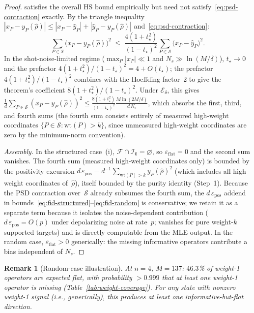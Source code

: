 \documentclass[twocolumn,prx,aps,superscriptaddress,longbibliography,floatfix]{revtex4-2}
\newtheorem*{remark}{Remark}
\begin{document}
\begin{proof}
satisfies the overall HS bound empirically but need
not satisfy~\eqref{eq:psd-contraction} exactly.
By the triangle inequality
$|x_P - y_P(\hat\rho)| \le |x_P - \hat{y}_P|
+ |\hat{y}_P - y_P(\hat\rho)|$
and~\eqref{eq:psd-contraction}:
\begin{equation}\label{eq:mle-variance-bound}
  \sum_{P \in \mathcal{S}}
  \bigl(x_P - y_P(\hat\rho)\bigr)^2
  \;\le\;
  \frac{4(1{+}t_\star^2)}{(1{-}t_\star)^2}
  \sum_{P \in \mathcal{S}}
  \bigl(x_P - \hat{y}_P\bigr)^2.
\end{equation}
In the shot-noise-limited regime ($\max_P |x_P| \ll 1$ and $N_s \gg \ln(M/\delta)$),
$t_\star \to 0$ and the prefactor
$4(1{+}t_\star^2)/(1{-}t_\star)^2 = 4 + O(t_\star)$;
the prefactor $4(1{+}t_\star^2)/(1{-}t_\star)^2$
combines with the Hoeffding factor~$2$
to give the theorem's coefficient
$8(1{+}t_\star^2)/(1{-}t_\star)^2$.
Under $\mathcal{E}_\delta$, this gives
$\frac{1}{d}\sum_{P \in \mathcal{S}}(x_P - y_P(\hat\rho))^2
\le \frac{8(1{+}t_\star^2)}{(1{-}t_\star)^2}
\frac{M\ln(2M/\delta)}{d\,N_s}$,
which absorbs the first, third, and fourth sums
(the fourth sum consists entirely of measured high-weight
coordinates $\{P \in \mathcal{S} : \mathrm{wt}(P) > k\}$,
since unmeasured high-weight coordinates are zero by
the minimum-norm convention).

\emph{Assembly.}
In the structured case~(i), $\mathcal{F} \cap \mathcal{I}_0 =
\varnothing$, so $\varepsilon_{\mathrm{flat}} = 0$ and the second
sum vanishes.
The fourth sum (measured high-weight coordinates only)
is bounded by the positivity excursion
$d\,\varepsilon_{\mathrm{pos}} =
d^{-1}\sum_{\mathrm{wt}(P)>k} y_P(\hat\rho)^2$
(which includes all high-weight coordinates of~$\hat\rho$),
itself bounded by the purity identity (Step~1).
Because the PSD contraction over~$\mathcal{S}$ already
subsumes the fourth sum, the
$d\,\varepsilon_{\mathrm{pos}}$ addend in
bounds~\eqref{eq:fid-structured}--\eqref{eq:fid-random}
is conservative; we retain it as a separate term because
it isolates the noise-dependent contribution
($d\,\varepsilon_{\mathrm{pos}} = O(p)$ under depolarizing
noise at rate~$p$; vanishes for pure weight-$k$ supported targets)
and is directly computable from the MLE output.
In the random case, $\varepsilon_{\mathrm{flat}} > 0$ generically:
the missing informative operators contribute a bias
independent of $N_s$.

\end{proof}

\begin{remark}[Random-case illustration]
At $n = 4$, $M = 137$: $46.3$\% of weight-1 operators are
expected flat, with probability $> 0.999$ that at least one
weight-1 operator is missing
(Table~\ref{tab:weight-coverage}).
For any state with nonzero
weight-1 signal (i.e., generically), this produces at least
one informative-but-flat direction.
\end{remark}
\end{document}
